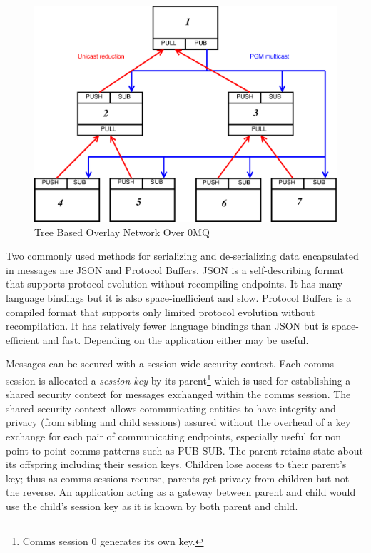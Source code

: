 \begin{figure}
\centering
\includegraphics[scale=0.35]{../fig/zmqtbon.eps}
\caption{Tree Based Overlay Network Over 0MQ}
\label{FigZmqTBON}
\end{figure}

Two commonly used methods for serializing and de-serializing data
encapsulated in messages are
JSON\cite{rfc4627} 
and Protocol Buffers\cite{Protobuf}.
JSON is a self-describing format
that supports protocol evolution without recompiling endpoints.  It has
many language bindings but it is also space-inefficient and slow.
Protocol Buffers is a compiled format that supports
only limited protocol evolution without recompilation.  It has relatively
fewer language bindings than JSON but is space-efficient and fast.
Depending on the application either may be useful.

Messages can be secured with a session-wide security context.
Each comms session is allocated a {\em session key} by its parent\footnote{
Comms session 0 generates its own key.}
which is used for establishing a shared security context
for messages exchanged within the comms session.
The shared security context allows communicating entities to have integrity
and privacy (from sibling and child sessions) assured without the overhead
of a key exchange for each pair of communicating endpoints,
especially useful for non point-to-point comms patterns such as PUB-SUB.
The parent retains state about its offspring including their session keys.
Children lose access to their parent's key;  thus as comms sessions recurse,
parents get privacy from children but not the reverse.
An application acting as a gateway between parent and child would use
the child's session key as it is known by both parent and child.


